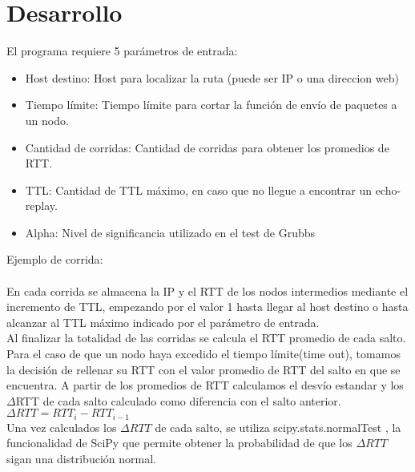 \section{Desarrollo}


El programa requiere 5 parámetros de entrada:

\begin{itemize}

\item  Host destino: Host para localizar la ruta (puede ser IP o una direccion web)

\item Tiempo límite: Tiempo límite para cortar la función de envío de paquetes a un nodo.

\item Cantidad de corridas: Cantidad de corridas para obtener los promedios de RTT.

\item TTL: Cantidad de TTL máximo, en caso que no llegue a encontrar un echo-replay.

\item Alpha:  Nivel de significancia utilizado en el test de Grubbs

\end{itemize}

Ejemplo de corrida:
\\
\\

En cada corrida se almacena la IP y el RTT de los nodos intermedios mediante el incremento de TTL, empezando por el valor 1 hasta llegar al host destino o hasta alcanzar al TTL máximo indicado por el parámetro de entrada. 
\\
Al finalizar la totalidad de las corridas se calcula el RTT promedio de cada salto. Para el caso de que un nodo haya excedido el tiempo límite(time out), tomamos la decisión de rellenar su RTT con el valor promedio de RTT del salto en que se encuentra. A partir de los promedios de RTT calculamos el desvío estandar y los $\Delta$RTT de cada salto calculado como diferencia con el salto anterior.
$\Delta RTT = RTT_{i} - RTT _{i-1}$
\\
Una vez calculados los $\Delta RTT$ de cada salto, se utiliza scipy.stats.normalTest , la funcionalidad de SciPy que permite obtener la probabilidad de que los $\Delta RTT$ sigan una distribución normal.



